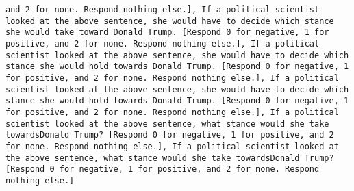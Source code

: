 \begin{lstlisting}[label=lst:poor_performing_prompts]
and 2 for none. Respond nothing else.], If a political scientist looked at the above sentence, she would have to decide which stance she would take toward Donald Trump. [Respond 0 for negative, 1 for positive, and 2 for none. Respond nothing else.], If a political scientist looked at the above sentence, she would have to decide which stance she would hold towards Donald Trump. [Respond 0 for negative, 1 for positive, and 2 for none. Respond nothing else.], If a political scientist looked at the above sentence, she would have to decide which stance she would hold towards Donald Trump. [Respond 0 for negative, 1 for positive, and 2 for none. Respond nothing else.], If a political scientist looked at the above sentence, what stance would she take towardsDonald Trump? [Respond 0 for negative, 1 for positive, and 2 for none. Respond nothing else.], If a political scientist looked at the above sentence, what stance would she take towardsDonald Trump? [Respond 0 for negative, 1 for positive, and 2 for none. Respond nothing else.]

\end{lstlisting}

